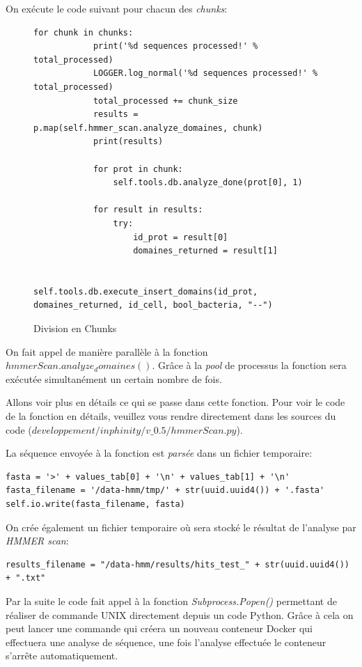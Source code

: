 On exécute le code suivant pour chacun des \emph{chunks}:

\begin{figure}[H] 
\centering 
\begin{lstlisting}[frame=single]
for chunk in chunks:
            print('%d sequences processed!' % total_processed)
            LOGGER.log_normal('%d sequences processed!' % total_processed)
            total_processed += chunk_size
            results = p.map(self.hmmer_scan.analyze_domaines, chunk)
            print(results)

            for prot in chunk:
                self.tools.db.analyze_done(prot[0], 1)

            for result in results:
                try:
                    id_prot = result[0]
                    domaines_returned = result[1]

                    self.tools.db.execute_insert_domains(id_prot, domaines_returned, id_cell, bool_bacteria, "--")
\end{lstlisting} 
\caption[Division en Chunks]{Division en Chunks}
\label{fig:chunks} 
\end{figure}

On fait appel de manière parallèle à la fonction \emph{$hmmerScan.analyze_domaines()$}. Grâce à la \emph{pool} de processus la fonction sera exécutée simultanément un certain nombre de fois.

Allons voir plus en détails ce qui se passe dans cette fonction. Pour voir le code de la fonction en détails, veuillez vous rendre directement dans les sources du code (\emph{$developpement/inphinity/v\_0.5/hmmerScan.py$}).

La séquence envoyée à la fonction est \emph{parsée} dans un fichier temporaire:

\begin{lstlisting}[frame=single]
fasta = '>' + values_tab[0] + '\n' + values_tab[1] + '\n'
fasta_filename = '/data-hmm/tmp/' + str(uuid.uuid4()) + '.fasta'
self.io.write(fasta_filename, fasta)
\end{lstlisting} 

On crée également un fichier temporaire où sera stocké le résultat de l'analyse par \emph{HMMER scan}:

\begin{lstlisting}[frame=single]
results_filename = "/data-hmm/results/hits_test_" + str(uuid.uuid4()) + ".txt"
\end{lstlisting} 

Par la suite le code fait appel à la fonction \emph{Subprocess.Popen()} permettant de réaliser de commande UNIX directement depuis un code Python. Grâce à cela on peut lancer une commande qui créera un nouveau conteneur Docker qui effectuera une analyse de séquence, une fois l'analyse effectuée le conteneur s'arrête automatiquement.


